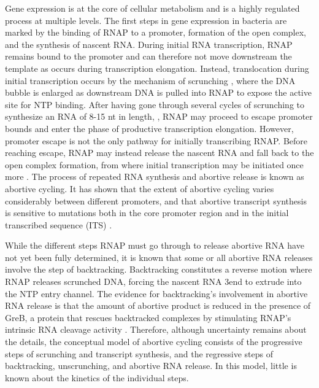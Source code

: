 %
Gene expression is at the core of cellular metabolism and is a highly regulated
process at multiple levels. The first steps in gene expression in bacteria are
marked by the binding of RNAP to a promoter, formation of the open complex,
and the synthesis of nascent RNA. During initial RNA transcription, RNAP
remains bound to the promoter and can therefore not move downstream the template as
occurs during transcription elongation. Instead, translocation during
initial transcription occurs by the mechanism of scrunching
\cite{revyakin_abortive_2006, kapanidis_initial_2006}, where the DNA bubble is
enlarged as downstream DNA is pulled into RNAP to expose the active site for
NTP binding. After having gone through several cycles of scrunching to
synthesize an RNA of 8-15 nt in length,
\cite{carpousis_cycling_1980,hsu_vitro_2003,tang_real-time_2009,hsu_initial_2006},
RNAP may proceed to escape promoter bounds and enter the phase of productive
transcription elongation. However, promoter escape is not the only pathway for
initially transcribing RNAP. Before reaching escape, RNAP may instead release
the nascent RNA and fall back to the open complex formation, from where
initial transcription may be initiated once more
\cite{carpousis_cycling_1980}. The process of repeated RNA synthesis and
abortive release is known as abortive cycling. It has shown that the extent of
abortive cycling varies considerably between different promoters, and that
abortive transcript synthesis is sensitive to mutations both in the core
promoter region and in the initial transcribed sequence (ITS)
\cite{hsu_initial_2006, hsu_promoter_2002, vo_vitro_2003}.

While the different steps RNAP must go through to release abortive RNA have
not yet been fully determined, it is known that some or all abortive RNA
releases involve the step of backtracking. Backtracking constitutes a reverse
motion where RNAP releases scrunched DNA, forcing the nascent RNA 3\ppp end to
extrude into the NTP entry channel. The evidence for backtracking's
involvement in abortive RNA release is that the amount of abortive product is
reduced in the presence of GreB, a protein that rescues backtracked complexes
by stimulating RNAP's intrinsic RNA cleavage activity
\cite{hsu_escherichia_1995,feng_grea-induced_1994,hsu_initial_2006}.
Therefore, although uncertainty remains about the details, the conceptual
model of abortive cycling consists of the progressive steps of scrunching and
transcript synthesis, and the regressive steps of backtracking, unscrunching,
and abortive RNA release. In this model, little is known about the kinetics of
the individual steps.

